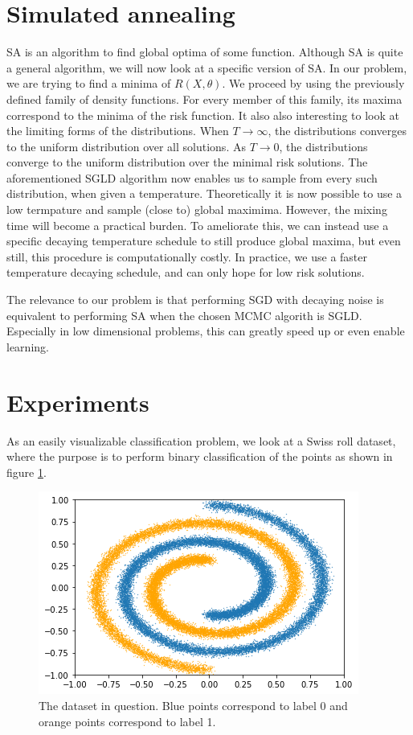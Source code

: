 \documentclass[twocolumn]{article}
\begin{document}
\section{Simulated annealing}
SA is an algorithm to find global optima of some function. Although SA is quite a general algorithm, we will now look at a specific version of SA. In our problem, we are trying to find a minima of $R(X, \theta)$. We proceed by using the previously defined family of density functions. For every member of this family, its maxima correspond to the minima of the risk function. It also also interesting to look at the limiting forms of the distributions. When $T\rightarrow \infty$, the distributions converges to the uniform distribution over all solutions. As $T \rightarrow 0$, the distributions converge to the uniform distribution over the minimal risk solutions. The aforementioned SGLD algorithm now enables us to sample from every such distribution, when given a temperature. Theoretically it is now possible to use a low termpature and sample (close to) global maximima. However, the mixing time will become a practical burden. To ameliorate this, we can instead use a specific decaying temperature schedule to still produce global maxima, but even still, this procedure is computationally costly. In practice, we use a faster temperature decaying schedule, and can only hope for low risk solutions.

The relevance to our problem is that performing SGD with decaying noise is equivalent to performing SA when the chosen MCMC algorith is SGLD. Especially in low dimensional problems, this can greatly speed up or even enable learning.

\section{Experiments}
As an easily visualizable classification problem, we look at a Swiss roll dataset, where the purpose is to perform binary classification of the points as shown in figure \ref{swiss_roll}.
\begin{figure}[ht!]
\begin{center}
  \centerline{\includegraphics[width=\columnwidth]{src/swiss_roll.png}}
\caption{The dataset in question. Blue points correspond to label 0 and orange points correspond to label 1.}
\label{swiss_roll}
\end{center}
\vskip -0.2in
\end{figure}
\end{document}
